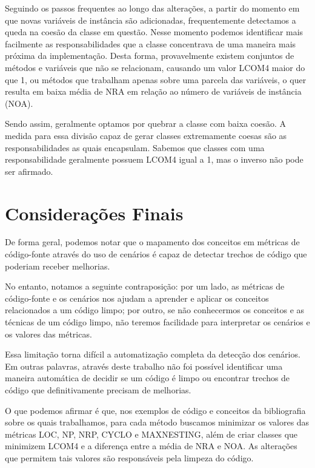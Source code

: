 Seguindo os passos frequentes ao longo das alterações, a partir do momento em que novas variáveis de instância
são adicionadas, frequentemente detectamos a queda na coesão da classe em questão. Nesse momento podemos identificar
mais facilmente as responsabilidades que a classe concentrava de uma maneira mais próxima da implementação.
Desta forma, provavelmente existem conjuntos de métodos e variáveis que não se relacionam, causando um valor LCOM4
maior do que 1, ou métodos que trabalham apenas sobre uma parcela das variáveis, o quer resulta em baixa média de
NRA em relação ao número de variáveis de instância (NOA).

Sendo assim, geralmente optamos por quebrar a classe com baixa coesão. A medida para essa divisão capaz de
gerar classes extremamente coesas são as responsabilidades as quais encapsulam. Sabemos que classes com uma
responsabilidade geralmente possuem LCOM4 igual a 1, mas o inverso não pode ser afirmado.

\section{Considerações Finais}
De forma geral, podemos notar que o mapamento dos conceitos em métricas de código-fonte através do uso
de cenários é capaz de detectar trechos de código que poderiam receber melhorias. 

No entanto, notamos a seguinte contraposição: por um lado, as métricas de código-fonte e os cenários nos
ajudam a aprender e aplicar os conceitos relacionados a um código limpo; por outro, se não conhecermos os
conceitos e as técnicas de um código limpo, não teremos facilidade para interpretar os cenários e os valores
das métricas.

Essa limitação torna difícil a automatização completa da detecção dos cenários. Em outras palavras,
através deste trabalho não foi possível identificar uma maneira automática de decidir se um código é limpo ou
encontrar trechos de código que definitivamente precisam de melhorias.

O que podemos afirmar é que, nos exemplos de código e conceitos da bibliografia sobre os quais trabalhamos,
para cada método buscamos minimizar os valores das métricas LOC, NP, NRP, CYCLO e MAXNESTING, além de criar
classes que minimizem LCOM4 e a diferença entre a média de NRA e NOA. As alterações que permitem tais valores
são responsáveis pela limpeza do código.

